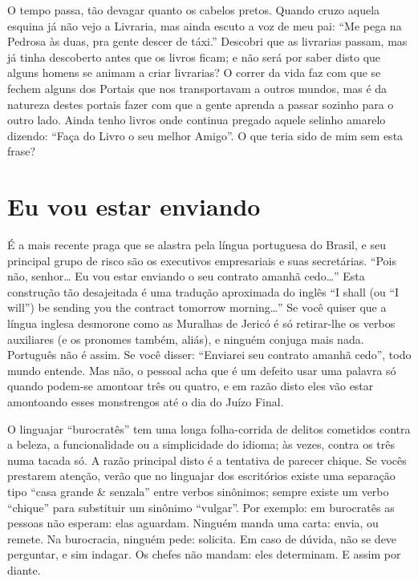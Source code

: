 O tempo passa, tão devagar quanto os cabelos pretos. Quando cruzo
aquela esquina já não vejo a Livraria, mas ainda escuto a voz de meu
pai: “Me pega na Pedrosa às duas, pra gente descer de táxi.” Descobri
que as livrarias passam, mas já tinha descoberto antes que os livros
ficam; e não será por saber disto que alguns homens se animam a criar
livrarias?  O correr da vida faz com que se fechem alguns dos Portais
que nos transportavam a outros mundos, mas é da natureza destes
portais fazer com que a gente aprenda a passar sozinho para o outro
lado. Ainda tenho livros onde continua pregado aquele selinho amarelo
dizendo: “Faça do Livro o seu melhor Amigo”. O que teria sido de mim
sem esta frase?

\chapter{Eu vou estar enviando}

É a mais recente praga que se alastra pela língua portuguesa do
Brasil, e seu principal grupo de risco são os executivos empresariais
e suas secretárias. “Pois não, senhor… Eu vou estar enviando o seu
contrato amanhã cedo…” Esta construção tão desajeitada é uma tradução
aproximada do inglês “I shall (ou “I will”) be sending you the
contract tomorrow morning…”  Se você quiser que a língua inglesa
desmorone como as Muralhas de Jericó é só retirar-lhe os verbos
auxiliares (e os pronomes também, aliás), e ninguém conjuga mais
nada. Português não é assim. Se você disser: “Enviarei seu contrato
amanhã cedo”, todo mundo entende. Mas não, o pessoal acha que é um
defeito usar uma palavra só quando podem-se amontoar três ou quatro,
e em razão disto eles vão estar amontoando esses monstrengos até o
dia do Juízo Final.

O linguajar “burocratês” tem uma longa folha-corrida de delitos
cometidos contra a beleza, a funcionalidade ou a simplicidade do
idioma; às vezes, contra os três numa tacada só.  A razão principal
disto é a tentativa de parecer chique. Se vocês prestarem atenção,
verão que no linguajar dos escritórios existe uma separação tipo
“casa grande \& senzala” entre verbos sinônimos; sempre existe um
verbo “chique” para substituir um sinônimo “vulgar”. Por exemplo: em
burocratês as pessoas não esperam: elas aguardam. Ninguém manda uma
carta: envia, ou remete. Na burocracia, ninguém pede: solicita. Em
caso de dúvida, não se deve perguntar, e sim indagar.  Os chefes não
mandam: eles determinam. E assim por diante.

